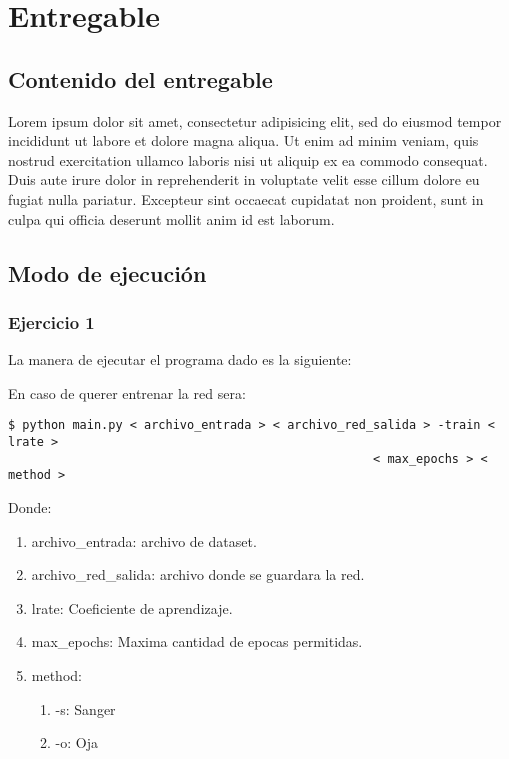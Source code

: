 \section{Entregable}
\subsection{Contenido del entregable}
Lorem ipsum dolor sit amet, consectetur adipisicing elit, sed do eiusmod
tempor incididunt ut labore et dolore magna aliqua. Ut enim ad minim veniam,
quis nostrud exercitation ullamco laboris nisi ut aliquip ex ea commodo
consequat. Duis aute irure dolor in reprehenderit in voluptate velit esse
cillum dolore eu fugiat nulla pariatur. Excepteur sint occaecat cupidatat non
proident, sunt in culpa qui officia deserunt mollit anim id est laborum.

\subsection{Modo de ejecución}




\subsubsection{Ejercicio 1}


La manera de ejecutar el programa dado es la siguiente:

En caso de querer entrenar la red sera:

\begin{verbatim}
$ python main.py < archivo_entrada > < archivo_red_salida > -train < lrate > 
                                                   < max_epochs > < method >    
\end{verbatim}

Donde:

\begin{enumerate}
\item archivo\_entrada: archivo de dataset.
\item archivo\_red\_salida: archivo donde se guardara la red.
\item lrate: Coeficiente de aprendizaje.
\item max\_epochs: Maxima cantidad de epocas permitidas.
\item method: 
\begin{enumerate}
\item -s: Sanger
\item -o: Oja
\end{enumerate}
\end{enumerate}

